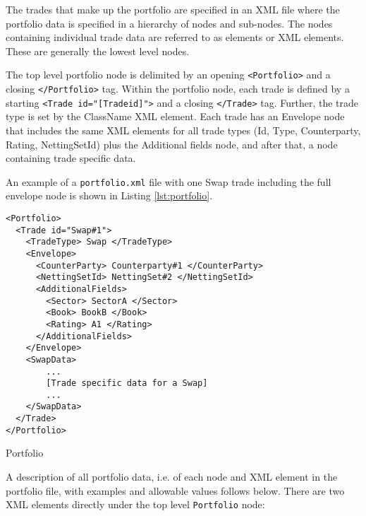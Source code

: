 The trades that make up the portfolio are specified in an XML file where the portfolio data is specified in a hierarchy of nodes and sub-nodes.  The nodes containing individual trade data are referred to as elements or XML elements. These are generally the lowest level nodes.

\vspace{1em}

The top level portfolio node is delimited by an opening {\tt <Portfolio>} and a closing {\tt </Portfolio>} tag. Within the portfolio node, each trade is defined by a starting {\tt <Trade id="[Tradeid]">} and a closing {\tt </Trade>} tag.  Further, the trade type is set by the ClassName XML element. Each trade has an Envelope node that includes the same XML elements  for all trade types (Id, Type, Counterparty, Rating, NettingSetId) plus the 
Additional fields node, and after that, a node containing trade specific data.

\vspace{1em}
An example of a {\tt portfolio.xml} file with one Swap trade including the full envelope node is shown in Listing \ref{lst:portfolio}.

\begin{listing}[H]
\begin{verbatim}
<Portfolio>
  <Trade id="Swap#1">
    <TradeType> Swap </TradeType>
    <Envelope>
      <CounterParty> Counterparty#1 </CounterParty>
      <NettingSetId> NettingSet#2 </NettingSetId>
      <AdditionalFields>
        <Sector> SectorA </Sector>
        <Book> BookB </Book>
        <Rating> A1 </Rating>
      </AdditionalFields>
    </Envelope>
    <SwapData>
        ...
        [Trade specific data for a Swap]
        ...
    </SwapData>
  </Trade>
</Portfolio>
\end{verbatim}
\caption{Portfolio}
\label{lst:portfolio}
\end{listing}

A description of all portfolio data, i.e. of each node and XML element in the portfolio file, with examples and allowable values follows below. There are two XML elements directly under the top level {\tt Portfolio} node:

